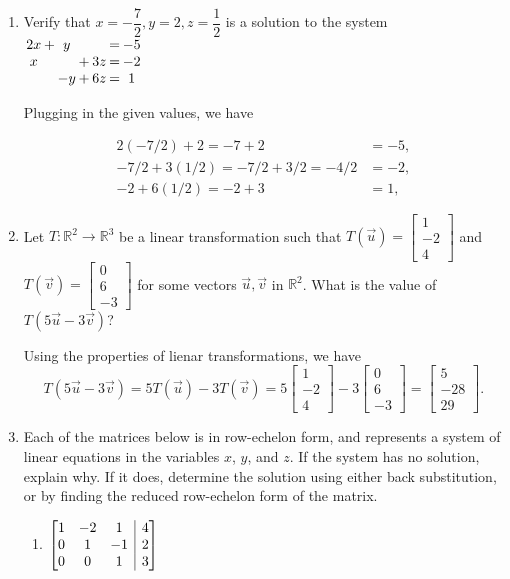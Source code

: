 \documentclass[12pt]{article}
\makeatletter
\newcommand{\points}[1]{\marginpar{\hspace{24pt}[#1]}}
\newcommand{\R}{\mathbb{R}}
\newcommand{\bbm}{\begin{bmatrix}}
\newcommand{\ebm}{\end{bmatrix}}
\newenvironment{amatrix}[1]{%
  \left[\begin{array}{@{}*{#1}{c}|c@{}}
}{%
  \end{array}\right]
}
\makeatother
\begin{document}
\begin{enumerate}
\item Verify that $x=-\dfrac{7}{2}, y=2, z=\dfrac{1}{2}$ is a solution to the system \points{4} \hspace{12pt} $\arraycolsep=1pt
 \begin{array}{ccccccc}
  2x&+&y& & &=&-5\\x& & &+&3z&=&-2\\ & &-y&+&6z&=&1
 \end{array}
$

\bigskip

Plugging in the given values, we have

\begin{align*}
 2(-7/2)+2 = -7+2 &= -5, \tag*{so the first equation works}\\
 -7/2 + 3(1/2) = -7/2+3/2 = -4/2&=-2, \tag*{so the second equation works}\\
 -2+6(1/2) = -2+3 &= 1, \tag*{so the third equation works}
\end{align*}

\medskip

\item Let $T:\R^2\to\R^3$ be a linear transformation such that $T(\vec{u}) = \bbm 1\\-2\\4\ebm$ and $T(\vec{v}) = \bbm 0\\6\\-3\ebm$ for some vectors $\vec{u}, \vec{v}$ in $\R^2$. What is the value of \points{4} $T(5\vec{u}-3\vec{v})$?

\bigskip

Using the properties of lienar transformations, we have
\[
 T(5\vec{u}-3\vec{v}) = 5T(\vec{u})-3T(\vec{v}) = 5\bbm 1\\-2\\4\ebm-3\bbm 0\\6\\-3\ebm =\bbm 5\\-28\\29\ebm.
\]


\newpage

\item Each of the matrices below is in row-echelon form, and represents a system of linear equations in the variables $x$, $y$, and $z$. If the system has no solution, explain why. If it does, determine the solution using either back substitution, or by finding the reduced row-echelon form of the matrix.\points{10}
\begin{enumerate}
 \item $\begin{amatrix}{3}1&-2&1&4\\0&1&-1&2\\0&0&1&3\end{amatrix}$ 


\end{enumerate}
\end{enumerate}
\end{document}
